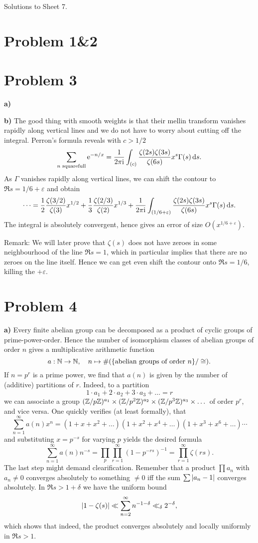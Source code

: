\documentclass[a4paper,11pt]{article}
\author{Max von Consbruch}
\begin{document}
\begin{center}
    \huge{Solutions to Sheet 7.}
\end{center}

\section*{Problem 1\&2}
\section*{Problem 3}
\textbf{a)}

\textbf{b)} The good thing with smooth weights is that their mellin transform
vanishes rapidly along vertical lines and we do not have to worry about cutting
off the integral. Perron's formula reveals with $c > 1/2$
\[
    \sum_{n \text{ squarefull}} \mathrm e^{-n/x} = \frac{1}{2 \pi \mathrm i} \int_{(c)} \frac{\zeta(2s) \zeta(3s)}
    {\zeta(6s)} x^s \Gamma(s) \mathrm{\,d} s.
\]
As $\Gamma$ vanishes rapidly along vertical lines, we can shift the contour to 
$\Re s = 1/6 + \varepsilon$ and obtain
\[
    \dots = \frac 12 \frac{\zeta(3/2)}{\zeta(3)} x^{1/2} + 
    \frac 13 \frac{\zeta(2/3)}{\zeta(2)} x^{1/3} + \frac{1}{2 \pi \mathrm i} \int_{(1/6 + \varepsilon)}
    \frac{\zeta(2s) \zeta(3s)} {\zeta(6s)} x^s \Gamma(s) \mathrm{\,d} s.
\]
The integral is absolutely convergent, hence gives an error of size
$O(x^{1/6+\varepsilon})$.

Remark: We will later prove that $\zeta(s)$ does not have zeroes in some
neighbourhood of the line $\Re s = 1$, which in particular implies that there
are no zeroes on the line itself. Hence we can get even shift the contour onto
$\Re s = 1/6$, killing the $+\varepsilon$. 

\section*{Problem 4}
\textbf{a)} Every finite abelian group can be decomposed as a product of 
cyclic groups of prime-power-order. Hence the number of isomorphism classes 
of abelian groups of order $n$ gives a multiplicative arithmetic function
$$a: \mathbb{N} \to \mathbb{N}, \quad n \mapsto \#(\{\text{abelian groups of order
$n$}\}/\cong).$$ 
If $n = p^r$ is a prime power, we find that $a(n)$ is given by the number of 
(additive) partitions of $r$. Indeed, to a partition
\[
    1 \cdot a_1 + 2\cdot a_2 + 3 \cdot a_3 + \dots  = r 
\]
we can associate a group $(\mathbb{Z}/p\mathbb{Z})^{a_1} \times (\mathbb{Z}/p^{2}\mathbb{Z})^{a_2} \times
(\mathbb{Z}/p^3\mathbb{Z})^{a_3} \times \dots$ of order $p^r$, and vice versa. One quickly verifies
(at least formally), that
\[
    \sum_{n=1}^\infty a(n) x^n = (1+x+x^2+\dots) (1+x^2+x^4+\dots) 
    (1+x^3+x^6+\dots)\cdots
\]
and substituting $x=p^{-s}$ for varying $p$ yields the desired formula
\[
    \sum_{n=1}^\infty a(n) n^{-s} = \prod_{p} \prod_{r=1}^\infty(1-p^{-rs})^{-1}
    = \prod_{r=1}^\infty \zeta(rs).
\]
The last step might demand clearification. Remember that a product $\prod a_n$
with $a_n \neq 0$ converges absolutely to something $\neq 0$ iff the sum $\sum
\left\lvert a_n-1 \right\rvert$ converges absolutely. In $\Re s > 1+\delta$ we have the uniform
bound
\[
    \left\lvert 1-\zeta(s) \right\rvert \ll \sum_{n=2}^\infty n^{-1-\delta} \ll_\delta 2^{-\delta},
\]
which shows that indeed, the product converges absolutely and locally uniformly in
$\Re s > 1$. 
\end{document}
